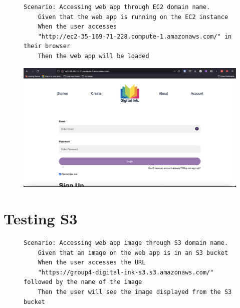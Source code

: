\clearpage

\begin{figure}[!htbp]
    \centering
    \begin{verbatim}
Scenario: Accessing web app through EC2 domain name.
    Given that the web app is running on the EC2 instance
    When the user accesses
    "http://ec2-35-169-71-228.compute-1.amazonaws.com/" in their browser
    Then the web app will be loaded
    \end{verbatim}
    \label{fig:accessing-web-app-ec2}
\end{figure}

\begin{figure}[!htbp]
    \centering
    \includegraphics[width=\textwidth]{resources/ec2/digital-ink-ec2}
    \label{fig:ec2-test-digital-ink}
\end{figure}

\clearpage

\section{Testing S3}\label{sec:testing-s3}

\begin{figure}[!htbp]
    \centering
    \begin{verbatim}
Scenario: Accessing web app image through S3 domain name.
    Given that an image on the web app is in an S3 bucket
    When the user accesses the URL
    "https://group4-digital-ink-s3.s3.amazonaws.com/" followed by the name of the image
    Then the user will see the image displayed from the S3 bucket
    \end{verbatim}
    \label{fig:accessing-image-s3}
\end{figure}

